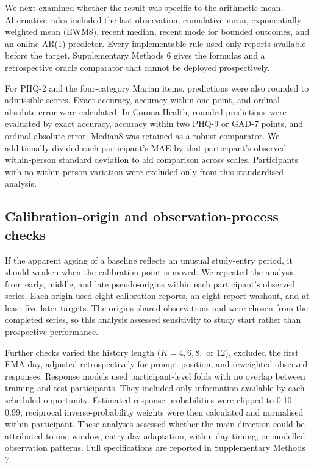 \documentclass[pdflatex,sn-vancouver-num]{sn-jnl}
\begin{document}
We next examined whether the result was specific to the arithmetic mean. Alternative rules included the last observation, cumulative mean, exponentially weighted mean (EWM8), recent median, recent mode for bounded outcomes, and an online AR(1) predictor. Every implementable rule used only reports available before the target. Supplementary Methods 6 gives the formulas and a retrospective oracle comparator that cannot be deployed prospectively.

For PHQ-2 and the four-category Marian items, predictions were also rounded to admissible scores. Exact accuracy, accuracy within one point, and ordinal absolute error were calculated. In Corona Health, rounded predictions were evaluated by exact accuracy, accuracy within two PHQ-9 or GAD-7 points, and ordinal absolute error; Median8 was retained as a robust comparator. We additionally divided each participant's MAE by that participant's observed within-person standard deviation to aid comparison across scales. Participants with no within-person variation were excluded only from this standardised analysis.

\subsection{Calibration-origin and observation-process checks}

If the apparent ageing of a baseline reflects an unusual study-entry period, it should weaken when the calibration point is moved. We repeated the analysis from early, middle, and late pseudo-origins within each participant's observed series. Each origin used eight calibration reports, an eight-report washout, and at least five later targets. The origins shared observations and were chosen from the completed series, so this analysis assessed sensitivity to study start rather than prospective performance.

Further checks varied the history length ($K=4,6,8,$ or 12), excluded the first EMA day, adjusted retrospectively for prompt position, and reweighted observed responses. Response models used participant-level folds with no overlap between training and test participants. They included only information available by each scheduled opportunity. Estimated response probabilities were clipped to 0.10--0.99; reciprocal inverse-probability weights were then calculated and normalised within participant. These analyses assessed whether the main direction could be attributed to one window, entry-day adaptation, within-day timing, or modelled observation patterns. Full specifications are reported in Supplementary Methods 7.
\end{document}
